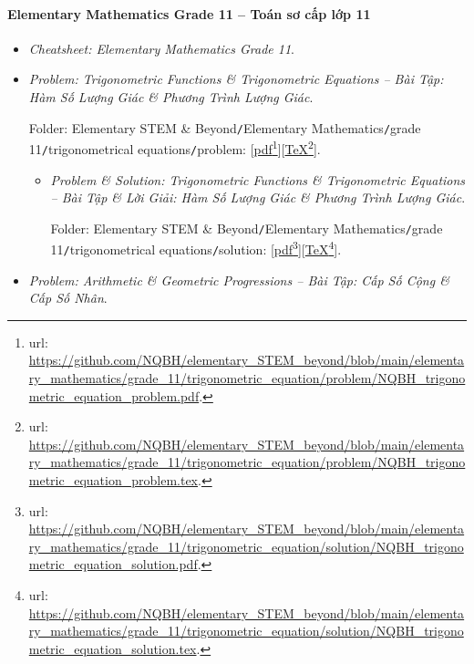 \documentclass[12pt]{article}
\begin{document}
\paragraph{Elementary Mathematics Grade 11 -- Toán sơ cấp lớp 11}

\begin{itemize}
	\item {\it Cheatsheet: Elementary Mathematics Grade 11}.
	\item {\it Problem: Trigonometric Functions \& Trigonometric Equations -- Bài Tập: Hàm Số Lượng Giác \& Phương Trình Lượng Giác}.
	
	Folder: {\sf Elementary STEM \& Beyond{\tt/}Elementary Mathematics{\tt/}grade 11{\tt/}trigonometrical equations{\tt/}problem}: [\href{https://github.com/NQBH/elementary_STEM_beyond/blob/main/elementary_mathematics/grade_11/trigonometric_equation/problem/NQBH_trigonometric_equation_problem.pdf}{pdf}\footnote{{\sc url}: \url{https://github.com/NQBH/elementary_STEM_beyond/blob/main/elementary_mathematics/grade_11/trigonometric_equation/problem/NQBH_trigonometric_equation_problem.pdf}.}][\href{https://github.com/NQBH/elementary_STEM_beyond/blob/main/elementary_mathematics/grade_11/trigonometric_equation/problem/NQBH_trigonometric_equation_problem.tex}{\TeX}\footnote{{\sc url}: \url{https://github.com/NQBH/elementary_STEM_beyond/blob/main/elementary_mathematics/grade_11/trigonometric_equation/problem/NQBH_trigonometric_equation_problem.tex}.}].
	\begin{itemize}
		\item {\it Problem \& Solution: Trigonometric Functions \& Trigonometric Equations -- Bài Tập \& Lời Giải: Hàm Số Lượng Giác \& Phương Trình Lượng Giác}.
		
		Folder: {\sf Elementary STEM \& Beyond{\tt/}Elementary Mathematics{\tt/}grade 11{\tt/}trigonometrical equations{\tt/}solution}: [\href{https://github.com/NQBH/elementary_STEM_beyond/blob/main/elementary_mathematics/grade_11/trigonometric_equation/solution/NQBH_trigonometric_equation_solution.pdf}{pdf}\footnote{{\sc url}: \url{https://github.com/NQBH/elementary_STEM_beyond/blob/main/elementary_mathematics/grade_11/trigonometric_equation/solution/NQBH_trigonometric_equation_solution.pdf}.}][\href{https://github.com/NQBH/elementary_STEM_beyond/blob/main/elementary_mathematics/grade_11/trigonometric_equation/solution/NQBH_trigonometric_equation_solution.tex}{\TeX}\footnote{{\sc url}: \url{https://github.com/NQBH/elementary_STEM_beyond/blob/main/elementary_mathematics/grade_11/trigonometric_equation/solution/NQBH_trigonometric_equation_solution.tex}.}].
	\end{itemize}
	\item {\it Problem: Arithmetic \& Geometric Progressions -- Bài Tập: Cấp Số Cộng \& Cấp Số Nhân}.
	

\end{itemize}
\end{document}
